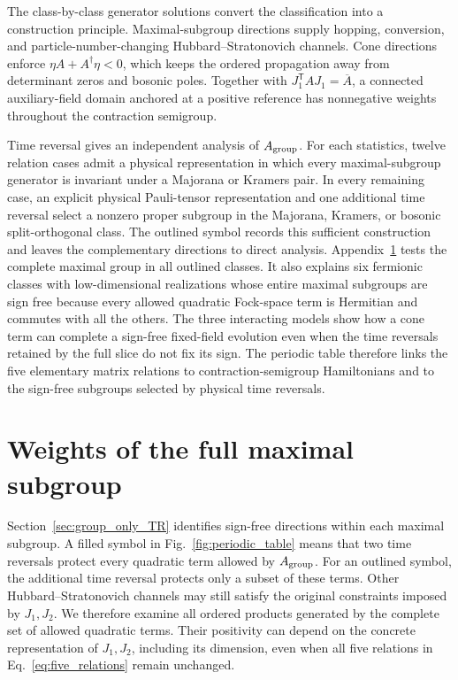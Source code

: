 \documentclass[onecolumn,aps,prb,amsmath,amssymb,superscriptaddress,longbibliography,floatfix]{revtex4-2}
\newcommand{\trans}{\mathsf{T}}
\begin{document}
The class-by-class generator solutions convert the classification into a construction principle.  Maximal-subgroup directions supply hopping, conversion, and particle-number-changing Hubbard--Stratonovich channels.  Cone directions enforce \(\eta A+A^\dagger\eta<0\), which keeps the ordered propagation away from determinant zeros and bosonic poles.  Together with \(J_1^\trans A J_1=\overline A\), a connected auxiliary-field domain anchored at a positive reference has nonnegative weights throughout the contraction semigroup.

Time reversal gives an independent analysis of \(A_{\rm group}\).  For each statistics, twelve relation cases admit a physical representation in which every maximal-subgroup generator is invariant under a Majorana or Kramers pair.  In every remaining case, an explicit physical Pauli-tensor representation and one additional time reversal select a nonzero proper subgroup in the Majorana, Kramers, or bosonic split-orthogonal class.  The outlined symbol records this sufficient construction and leaves the complementary directions to direct analysis.  Appendix~\ref{app:proper_subgroup_scope} tests the complete maximal group in all outlined classes.  It also explains six fermionic classes with low-dimensional realizations whose entire maximal subgroups are sign free because every allowed quadratic Fock-space term is Hermitian and commutes with all the others.  The three interacting models show how a cone term can complete a sign-free fixed-field evolution even when the time reversals retained by the full slice do not fix its sign.  The periodic table therefore links the five elementary matrix relations to contraction-semigroup Hamiltonians and to the sign-free subgroups selected by physical time reversals.

\appendix

\section{Weights of the full maximal subgroup}
\label{app:proper_subgroup_scope}

Section~\ref{sec:group_only_TR} identifies sign-free directions within each
maximal subgroup.  A filled symbol in Fig.~\ref{fig:periodic_table} means that
two time reversals protect every quadratic term allowed by \(A_{\rm group}\).
For an outlined symbol, the additional time reversal protects only a subset of
these terms.  Other Hubbard--Stratonovich channels may still satisfy the
original constraints imposed by \(J_1,J_2\).  We therefore examine all ordered
products generated by the complete set of allowed quadratic terms.  Their
positivity can depend on the concrete representation of \(J_1,J_2\), including
its dimension, even when all five relations in Eq.~\eqref{eq:five_relations}
remain unchanged.
\end{document}
